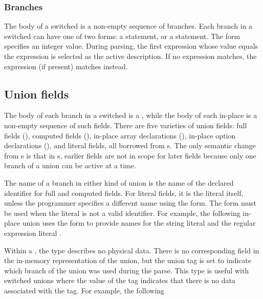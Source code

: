 \subsubsection{Branches}
The body of a switched \Punion{} is a non-empty sequence of branches.
Each branch in a switched \Punion{} can have one of two forms: a
\Pcase{} statement, or a \Pdefault{} statement.  The \Pcase{} form
specifies an integer value.  During parsing, the first \Pcase{}
expression whose value equals the \Pswitch{} expression is selected as
the active description. If no \Pcase{} expression
matches, the \Pdefault{} expression (if present) matches instead.

\subsection{Union fields}
The body of each branch in a switched \Punion{} is a ,
while the body of each in-place \Punion{} is a non-empty sequence of
such fields. 
There are five varieties of union fields: 
full fields (),
computed fields (), 
in-place array declarations (),
in-place option declarations (),
and literal fields, all borrowed from \Pstruct{}s.
The only semantic change from \Pstruct{}s  is
that in \Punion{}s, earlier fields are not in scope for later fields
because only one branch of a union can be active at a time.

The name of a branch in either kind of union is the name of the
declared identifier for full and computed fields.  For literal fields,
it is the literal itself, unless the programmer specifies a different
name using the \Pfrom{} form.  The \Pfrom{} form must be used when the
literal is not a valid \C{} identifier.  For example, the following
in-place union uses the \Pfrom{} form to provide names for the
string literal  and the regular expression literal .


Within a \punion{}, the type \pvoid{} describes no physical data.
There is no corresponding field in the in-memory representation of the
union, but the union tag is set to indicate which branch of the union
was used during the parse.
This type is useful with switched unions where the value of the tag
indicates that there is no data associated with the tag.  For example,
the following \punion{}  

